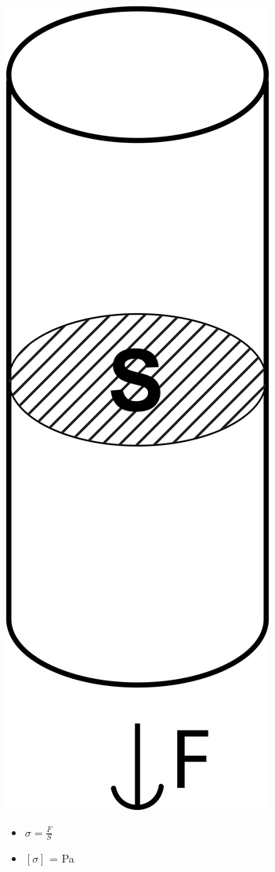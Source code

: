 \includegraphics[scale=0.2]{pictures/006.png}

\begin{itemize}
\item $\sigma = \frac{F}{S}$
\item $ [ \sigma ] $ = Pa
\end{itemize}

